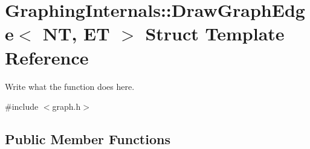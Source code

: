 \hypertarget{structGraphingInternals_1_1DrawGraphEdge}{\section{Graphing\+Internals\+:\+:Draw\+Graph\+Edge$<$ N\+T, E\+T $>$ Struct Template Reference}
\label{structGraphingInternals_1_1DrawGraphEdge}
}


Write what the function does here.  




{\ttfamily \#include $<$graph.\+h$>$}

\subsection*{Public Member Functions}
